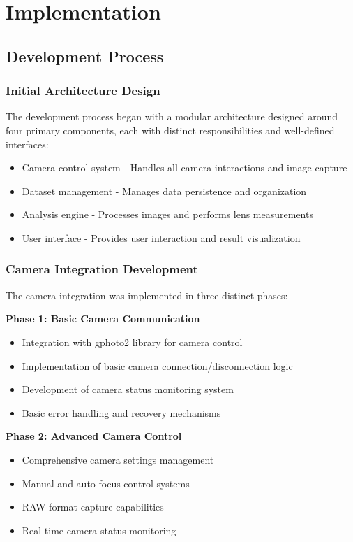 \chapter{Implementation}
\section{Development Process}

 \subsection{Initial Architecture Design}
The development process began with a modular architecture designed around four primary components, each with distinct responsibilities and well-defined interfaces:

\begin{itemize}
    \item Camera control system - Handles all camera interactions and image capture
    \item Dataset management - Manages data persistence and organization
    \item Analysis engine - Processes images and performs lens measurements
    \item User interface - Provides user interaction and result visualization
\end{itemize}

\subsection{Camera Integration Development}
The camera integration was implemented in three distinct phases:

\textbf{Phase 1: Basic Camera Communication}
\begin{itemize}
    \item Integration with gphoto2 library for camera control
    \item Implementation of basic camera connection/disconnection logic
    \item Development of camera status monitoring system
    \item Basic error handling and recovery mechanisms
\end{itemize}

\textbf{Phase 2: Advanced Camera Control}
\begin{itemize}
    \item Comprehensive camera settings management
    \item Manual and auto-focus control systems
    \item RAW format capture capabilities
    \item Real-time camera status monitoring
\end{itemize}

